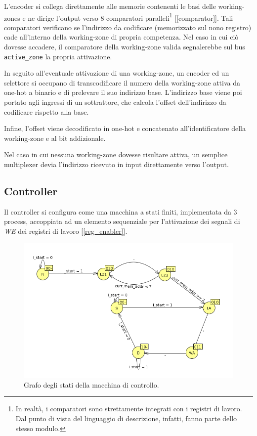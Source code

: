 \documentclass[11pt,a4paper]{article}
\begin{document}
L'encoder si collega direttamente alle memorie contenenti le basi delle working-zones e ne dirige l'output verso 8 comparatori paralleli\footnote{In
realtà, i comparatori sono strettamente integrati con i registri di lavoro. Dal punto di vista del linguaggio di descrizione, infatti, fanno parte dello
stesso modulo.} [\ref{comparator}]. Tali comparatori verificano se l'indirizzo da codificare (memorizzato sul nono registro) cade all'interno della
working-zone di propria competenza. Nel caso in cui ciò dovesse accadere, il comparatore della working-zone valida segnalerebbe sul bus
\lstinline{active_zone} la propria attivazione.

In seguito all'eventuale attivazione di una working-zone, un encoder ed un selettore si occupano di transcodificare il numero della working-zone attiva
da one-hot a binario e di prelevare il suo indirizzo base. L'indirizzo base viene poi portato agli ingressi di un sottrattore, che calcola l'offset
dell'indirizzo da codificare rispetto alla base.

Infine, l'offset viene decodificato in one-hot e concatenato all'identificatore della working-zone e al bit addizionale.

Nel caso in cui nessuna working-zone dovesse risultare attiva, un semplice multiplexer devia l'indirizzo ricevuto in input direttamente verso l'output.

\subsection{Controller}
Il controller si configura come una macchina a stati finiti, implementata da 3 process, accoppiata ad un elemento sequenziale per l'attivazione dei
segnali di \emph{WE} dei registri di lavoro [\ref{reg_enabler}].

\begin{figure}[hp]
    \includegraphics[scale=0.5]{machine_states.png}
    \caption[Stati della macchina di controllo]{Grafo degli stati della macchina di controllo.}
\end{figure}
\end{document}
